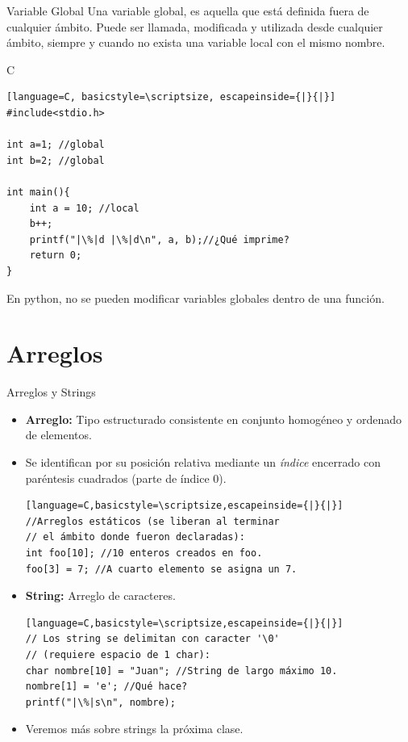 \documentclass{beamer}
\begin{document}
\begin{frame}[fragile]{Variable Global}
Una variable global, es aquella que está definida fuera de cualquier ámbito. Puede ser llamada, modificada y utilizada desde cualquier ámbito, siempre y cuando no exista una variable local con el mismo nombre. 

\begin{exampleblock}{C}
\begin{lstlisting}[language=C, basicstyle=\scriptsize, escapeinside={|}{|}]
#include<stdio.h>

int a=1; //global
int b=2; //global

int main(){
	int a = 10; //local
	b++;
	printf("|\%|d |\%|d\n", a, b);//¿Qué imprime? 
	return 0;
}
\end{lstlisting}\end{exampleblock}

En python, no se pueden modificar variables globales dentro de una función.
\end{frame}

\section{Arreglos}
\begin{frame}[fragile]{Arreglos y Strings}
\small
\begin{itemize}
	\item \textbf{Arreglo:} Tipo estructurado consistente en conjunto homogéneo y ordenado de elementos.
	\item Se identifican por su posición relativa mediante un \emph{índice} encerrado con paréntesis cuadrados (parte de índice 0).
	\begin{lstlisting}[language=C,basicstyle=\scriptsize,escapeinside={|}{|}]
//Arreglos estáticos (se liberan al terminar 
// el ámbito donde fueron declaradas):
int foo[10]; //10 enteros creados en foo.
foo[3] = 7; //A cuarto elemento se asigna un 7.
	\end{lstlisting}
	
	\item \textbf{String:} Arreglo de caracteres.
	\begin{lstlisting}[language=C,basicstyle=\scriptsize,escapeinside={|}{|}]
// Los string se delimitan con caracter '\0' 
// (requiere espacio de 1 char):
char nombre[10] = "Juan"; //String de largo máximo 10. 
nombre[1] = 'e'; //Qué hace? 
printf("|\%|s\n", nombre);
	\end{lstlisting}

	\item Veremos más sobre strings la próxima clase. 	
\end{itemize}
\end{frame}
\end{document}
